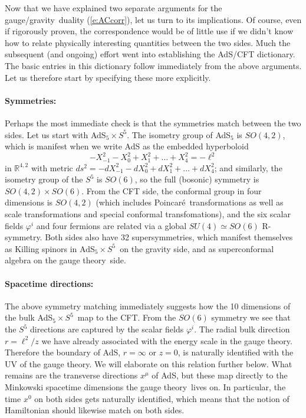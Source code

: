\documentclass[12pt]{article}
\def\req#1{(\ref{#1})}
\def\GG{gauge/gravity}
\def\GT{gauge theory}
\def\Poinc{Poincar\' e}
\def\RR{\mathbb{R}}
\def\adss#1#2{AdS$_{#1} \times S^{#2}$}
\def\Rads{\ell}
\def\ph{\varphi}
\begin{document}
Now that we have explained two separate arguments for the \GG\ duality \req{e:ACcorr}, let us turn to its implications.  Of course, even if rigorously proven, the correspondence would be of little use if we didn't know how to relate physically interesting quantities between the two sides.  Much the subsequent (and ongoing) effort went into establishing the AdS/CFT dictionary. 
The basic entries in this dictionary follow immediately from the above arguments.  Let us therefore start by specifying these more explicitly.

\paragraph{Symmetries:}  %
Perhaps the most immediate check is that the symmetries match between the two sides.
Let us start with \adss55.  The isometry group of AdS$_5$ is $SO(4,2)$, which is manifest when we write AdS as the embedded hyperboloid
%
\begin{equation}
-X_{-1}^2 - X_{0}^2 + X_{1}^2 + 
 \ldots  
+ X_{4}^2= - \Rads^2
\label{}
\end{equation}	
%
in $\RR^{4,2}$ with metric
$ds^2 = -dX_{-1}^2 - dX_{0}^2 + dX_{1}^2 + \ldots + dX_{4}^2 $; and similarly, the isometry group of the $S^5$ is $SO(6)$, so the full
(bosonic) symmetry is $SO(4,2) \times SO(6)$.
From the CFT side, the conformal group in four dimensions is $SO(4, 2)$ (which includes \Poinc\ transformations as well as scale transformations and special conformal transfomations), and the six scalar fields $\ph^i$ and four fermions are related via a global $SU(4) \simeq SO(6)$ R-symmetry.  Both sides also have 32 supersymmetries, which manifest themselves as Killing spinors in  \adss55\ on the gravity side, and as superconformal algebra on the \GT\ side.

\paragraph{Spacetime directions:}  %
The above symmetry matching immediately suggests how the 10 dimensions of the bulk \adss55\ map to the CFT.  From the $SO(6)$ symmetry we see that the $S^5$ directions  are captured by the scalar fields $\ph^i$.   The radial bulk direction $r = \Rads^2/z$ we have already  associated with the energy scale in the \GT.  
Therefore the boundary of AdS, $r=\infty$ or $z=0$, is naturally identified with the UV of the \GT.  We will elaborate on this relation further below.
What remains are the transverse directions $x^\mu$ of AdS, but these map directly to the Minkowski spacetime dimensions the \GT\ lives on.
In particular, the time $x^0$ on both sides gets naturally identified, which means that the notion of Hamiltonian should likewise match on both sides.
\end{document}
